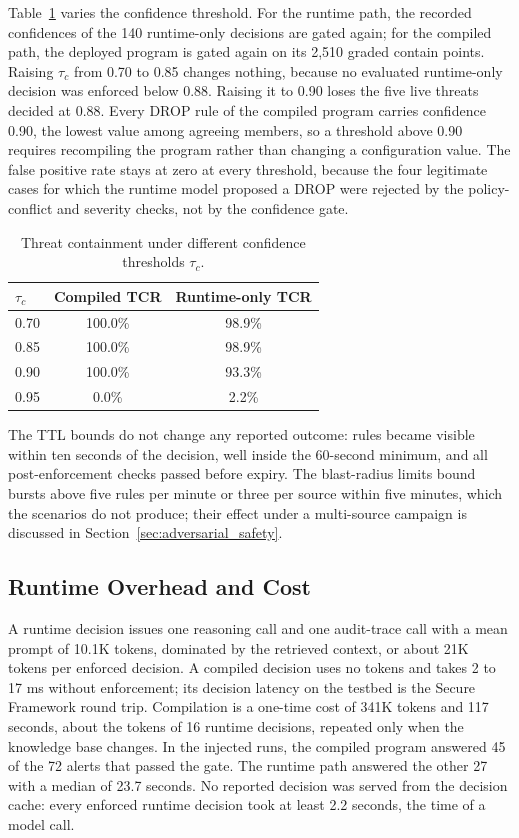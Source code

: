 \documentclass[final,5p]{elsarticle}
\begin{document}
Table~\ref{tab:tau} varies the confidence threshold. For the runtime path, the recorded confidences of the 140 runtime-only decisions are gated again; for the compiled path, the deployed program is gated again on its 2,510 graded contain points. Raising $\tau_c$ from 0.70 to 0.85 changes nothing, because no evaluated runtime-only decision was enforced below 0.88. Raising it to 0.90 loses the five live threats decided at 0.88. Every DROP rule of the compiled program carries confidence 0.90, the lowest value among agreeing members, so a threshold above 0.90 requires recompiling the program rather than changing a configuration value. The false positive rate stays at zero at every threshold, because the four legitimate cases for which the runtime model proposed a DROP were rejected by the policy-conflict and severity checks, not by the confidence gate.

\begin{table}[t]
    \centering
    \caption{Threat containment under different confidence thresholds $\tau_c$.}
    \label{tab:tau}
    \small
    \setlength{\tabcolsep}{5pt}
    \begin{tabular}{@{}lcc@{}}
        \toprule
        $\tau_c$ & \textbf{Compiled TCR} & \textbf{Runtime-only TCR} \\
        \midrule
        0.70 & 100.0\% & 98.9\% \\
        0.85 & 100.0\% & 98.9\% \\
        0.90 & 100.0\% & 93.3\% \\
        0.95 & 0.0\%   & 2.2\%  \\
        \bottomrule
    \end{tabular}
\end{table}

The TTL bounds do not change any reported outcome: rules became visible within ten seconds of the decision, well inside the 60-second minimum, and all post-enforcement checks passed before expiry. The blast-radius limits bound bursts above five rules per minute or three per source within five minutes, which the scenarios do not produce; their effect under a multi-source campaign is discussed in Section~\ref{sec:adversarial_safety}.

\subsection{Runtime Overhead and Cost}
\label{sec:overhead}

A runtime decision issues one reasoning call and one audit-trace call with a mean prompt of 10.1K tokens, dominated by the retrieved context, or about 21K tokens per enforced decision. A compiled decision uses no tokens and takes 2 to 17 ms without enforcement; its decision latency on the testbed is the Secure Framework round trip. Compilation is a one-time cost of 341K tokens and 117 seconds, about the tokens of 16 runtime decisions, repeated only when the knowledge base changes. In the injected runs, the compiled program answered 45 of the 72 alerts that passed the gate. The runtime path answered the other 27 with a median of 23.7 seconds. No reported decision was served from the decision cache: every enforced runtime decision took at least 2.2 seconds, the time of a model call.
\end{document}
